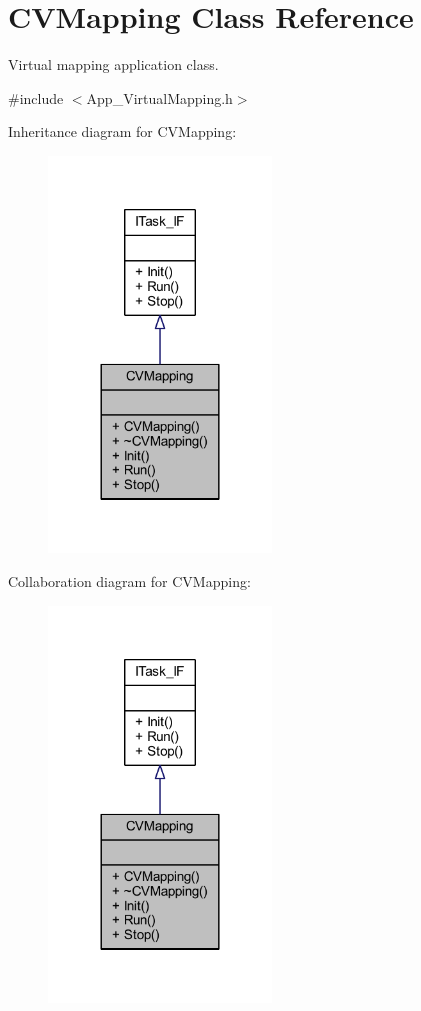 \hypertarget{class_c_v_mapping}{}\section{C\+V\+Mapping Class Reference}
\label{class_c_v_mapping}


Virtual mapping application class.  




{\ttfamily \#include $<$App\+\_\+\+Virtual\+Mapping.\+h$>$}



Inheritance diagram for C\+V\+Mapping\+:\nopagebreak
\begin{figure}[H]
\begin{center}
\leavevmode
\includegraphics[width=168pt]{class_c_v_mapping__inherit__graph}
\end{center}
\end{figure}


Collaboration diagram for C\+V\+Mapping\+:\nopagebreak
\begin{figure}[H]
\begin{center}
\leavevmode
\includegraphics[width=168pt]{class_c_v_mapping__coll__graph}
\end{center}
\end{figure}
